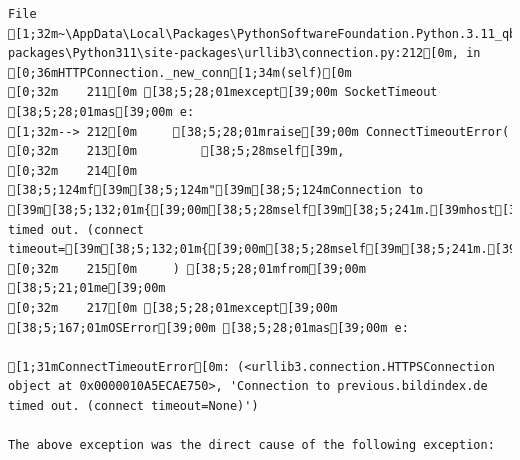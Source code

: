 \documentclass[
  letterpaper,
]{book}
\begin{document}
\begin{verbatim}
File [1;32m~\AppData\Local\Packages\PythonSoftwareFoundation.Python.3.11_qbz5n2kfra8p0\LocalCache\local-packages\Python311\site-packages\urllib3\connection.py:212[0m, in [0;36mHTTPConnection._new_conn[1;34m(self)[0m
[0;32m    211[0m [38;5;28;01mexcept[39;00m SocketTimeout [38;5;28;01mas[39;00m e:
[1;32m--> 212[0m     [38;5;28;01mraise[39;00m ConnectTimeoutError(
[0;32m    213[0m         [38;5;28mself[39m,
[0;32m    214[0m         [38;5;124mf[39m[38;5;124m"[39m[38;5;124mConnection to [39m[38;5;132;01m{[39;00m[38;5;28mself[39m[38;5;241m.[39mhost[38;5;132;01m}[39;00m[38;5;124m timed out. (connect timeout=[39m[38;5;132;01m{[39;00m[38;5;28mself[39m[38;5;241m.[39mtimeout[38;5;132;01m}[39;00m[38;5;124m)[39m[38;5;124m"[39m,
[0;32m    215[0m     ) [38;5;28;01mfrom[39;00m [38;5;21;01me[39;00m
[0;32m    217[0m [38;5;28;01mexcept[39;00m [38;5;167;01mOSError[39;00m [38;5;28;01mas[39;00m e:

[1;31mConnectTimeoutError[0m: (<urllib3.connection.HTTPSConnection object at 0x0000010A5ECAE750>, 'Connection to previous.bildindex.de timed out. (connect timeout=None)')

The above exception was the direct cause of the following exception:


\end{verbatim}
\end{document}
